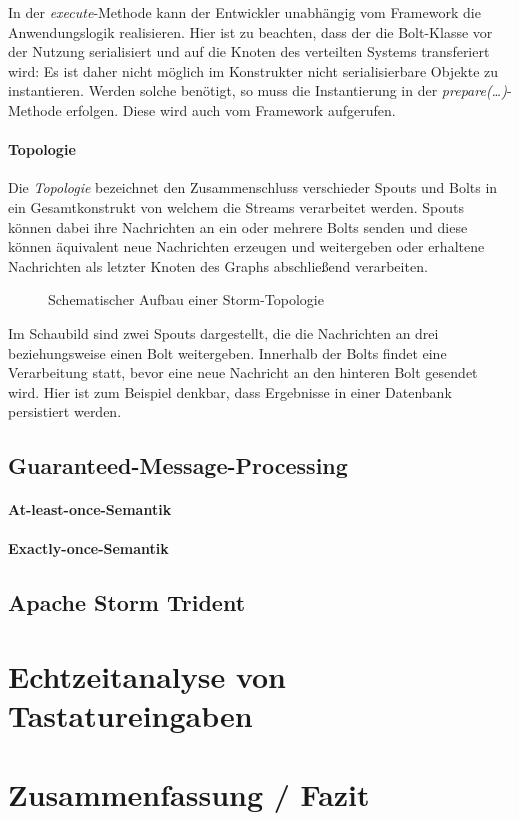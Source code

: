 \documentclass[a4paper,11pt]{scrartcl}
\begin{document}
  In der \textit{execute}-Methode kann der Entwickler unabhängig vom
  Framework die Anwendungslogik realisieren. Hier ist zu beachten,
  dass der die Bolt-Klasse vor der Nutzung serialisiert und auf die
  Knoten des verteilten Systems transferiert wird: Es ist daher nicht
  möglich im Konstrukter nicht serialisierbare Objekte zu instantieren.
  Werden solche benötigt, so muss die Instantierung in der
  \textit{prepare(\ldots)}-Methode erfolgen. Diese wird auch vom
  Framework aufgerufen.

  \paragraph{Topologie}
  Die \textit{Topologie} bezeichnet den Zusammenschluss verschieder
  Spouts und Bolts in ein Gesamtkonstrukt von welchem die Streams
  verarbeitet werden. Spouts können dabei ihre Nachrichten an ein oder
  mehrere Bolts senden und diese können äquivalent neue Nachrichten
  erzeugen und weitergeben oder erhaltene Nachrichten als letzter
  Knoten des Graphs abschließend verarbeiten.
  \begin{figure}[!h]
    \center
    \scalebox{.7}{}
    \caption{Schematischer Aufbau einer Storm-Topologie}
    \label{fig:topology}
  \end{figure}
  Im Schaubild sind zwei Spouts dargestellt, die die Nachrichten an
  drei beziehungsweise einen Bolt weitergeben. Innerhalb der Bolts
  findet eine Verarbeitung statt, bevor eine neue Nachricht an den
  hinteren Bolt gesendet wird. Hier ist zum Beispiel denkbar, dass
  Ergebnisse in einer Datenbank persistiert werden.

  \subsection{Guaranteed-Message-Processing}
  \paragraph{At-least-once-Semantik}
  \paragraph{Exactly-once-Semantik}

  \subsection{Apache Storm Trident} 

  \section{Echtzeitanalyse von Tastatureingaben}


  \section{Zusammenfassung / Fazit}


  
\end{document}
